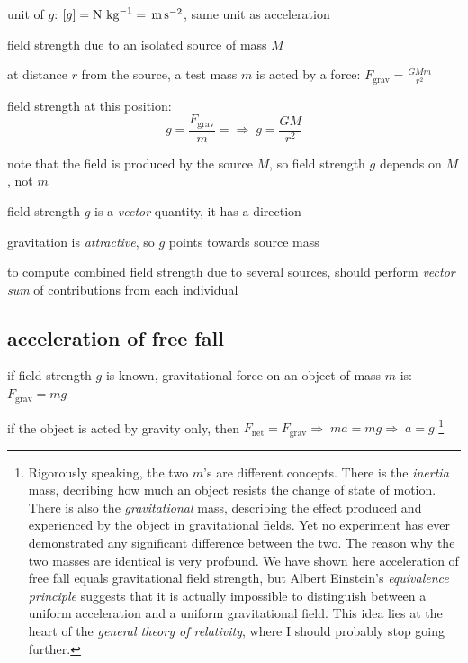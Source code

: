 \documentclass[a4paper,12pt]{book}
\newcommand{\cmt}{}
\newcommand{\fnet}{F_{\text{net}}}
\newcommand{\mpss}{\,\text{m\,s}^{-2}}
\newcommand{\RA}{\Rightarrow\;}
\newcommand{\tcbhighmath}[1]{\boxed{#1}}
\newcommand{\cmt}{}
\begin{document}
\cmt unit of $g$: $[g]=\text{N kg}^{-1} = \mpss$, same unit as acceleration

\cmt field strength due to an isolated source of mass $M$

at distance $r$ from the source, a test mass $m$ is acted by a force: $F_\text{grav} = \frac{GMm}{r^2}$

field strength at this position: $$g = \frac{F_\text{grav}}{m} = \RA \tcbhighmath{g=\frac{GM}{r^2}}$$

note that the field is produced by the source $M$, so field strength $g$ depends on $M$, not $m$

\cmt field strength $g$ is a \emph{vector} quantity, it has a direction

gravitation is \emph{attractive}, so $g$ points towards source mass

to compute combined field strength due to several sources, should perform \emph{vector sum} of contributions from each individual

\begin{center}
\end{center}

\subsection{acceleration of free fall}

if field strength $g$ is known, gravitational force on an object of mass $m$ is: $F_\text{grav} = mg$

if the object is acted by gravity only, then $\fnet = F_\text{grav} \RA ma = mg \RA \tcbhighmath{a=g}$
\footnote[][-.1cm]{Rigorously speaking, the two $m$'s are different concepts. There is the \emph{inertia} mass, decribing how much an object resists the change of state of motion. There is also the \emph{gravitational} mass, describing the effect produced and experienced by the object in gravitational fields. Yet no experiment has ever demonstrated any significant difference between the two. The reason why the two masses are identical is very profound. We have shown here acceleration of free fall equals gravitational field strength, but Albert Einstein's \emph{equivalence principle} suggests that it is actually impossible to distinguish between a uniform acceleration and a uniform gravitational field. This idea lies at the heart of the \emph{general theory of relativity}, where I should probably stop going further.}
\end{document}
